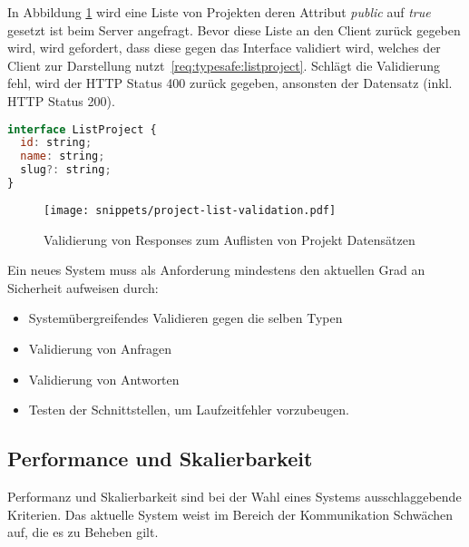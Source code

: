 In Abbildung \ref{req:typesafe:list-validation} wird eine Liste von Projekten deren Attribut \emph{public} auf \emph{true} gesetzt ist beim Server angefragt. Bevor diese Liste an den Client zurück gegeben wird, wird gefordert, dass diese gegen das Interface validiert wird, welches der Client zur Darstellung nutzt~\ref{req:typesafe:listproject}. Schlägt die Validierung fehl, wird der HTTP Status 400 zurück gegeben, ansonsten der Datensatz (inkl. HTTP Status 200).

\begin{lstlisting}[language=Javascript,float=h!,caption={Interface zum Auflisten von Projekten}, label={req:typesafe:listproject}]
interface ListProject {
  id: string;
  name: string;
  slug?: string;
}
\end{lstlisting}

\begin{figure}[h!]
    \centering
    \texttt{[image: snippets/project-list-validation.pdf]}
    \caption{Validierung von Responses zum Auflisten von Projekt Datensätzen}
    \label{req:typesafe:list-validation}
\end{figure}

Ein neues System muss als Anforderung mindestens den aktuellen Grad an Sicherheit aufweisen durch:

\begin{itemize}
    \setlength\itemsep{-1em}
    \item Systemübergreifendes Validieren gegen die selben Typen
    \item Validierung von Anfragen
    \item Validierung von Antworten
    \item Testen der Schnittstellen, um Laufzeitfehler vorzubeugen.
\end{itemize}


\subsection{Performance und Skalierbarkeit}
Performanz und Skalierbarkeit sind bei der Wahl eines Systems ausschlaggebende Kriterien. Das aktuelle System weist im Bereich der Kommunikation Schwächen auf, die es zu Beheben gilt.

